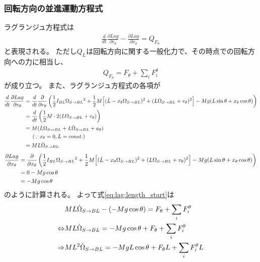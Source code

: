 \documentclass[a4paper,11pt]{jsarticle}
\begin{document}
\subsubsection*{回転方向の並進運動方程式}
ラグランジュ方程式は
\begin{align*}
  \frac{d}{dt}\frac{\partial Lag}{\partial v_\theta} - \frac{\partial Lag}{\partial x_\theta} = Q_{F_\theta}
\end{align*}
と表現される。
ただし$Q_L$は回転方向に関する一般化力で、その時点での回転方向への力に相当し、
\begin{align*}
  Q_{F_\theta} = F_\theta + \sum_i F_i^\theta
\end{align*}
が成り立つ。
また、ラグランジュ方程式の各項が
\begin{align*}
  \frac{d}{dt}\frac{\partial Lag}{\partial v_\theta}
  &= \frac{d}{dt}\frac{\partial }{\partial v_\theta}
  \left(
    \frac{1}{2}I_{BL}\Omega_{S\rightarrow BL}{}^2
    + \frac{1}{2}M
    \Bigl[ (\dot{L} - x_\theta \Omega_{S\rightarrow BL}{})^2 + (L\Omega_{S\rightarrow BL}{} + v_\theta)^2 \Bigr]
    - Mg ( L\sin\theta + x_\theta \cos\theta )
  \right)
  \\
  & = \frac{d}{dt}\left( \frac{1}{2}M \cdot 2(L\Omega_{S\rightarrow BL}{} + v_\theta )\right)
  \\
  &= M( \dot{L}\Omega_{S\rightarrow BL}{} + L\dot\Omega_{S\rightarrow BL}{} + a_\theta )
  \\
  & \ \ \ \ \left( \because x_\theta = 0, L = const. \right)
  \\
  &= M L \dot\Omega_{S\rightarrow BL}{}
\end{align*}
\begin{align*}
  \frac{\partial Lag}{\partial x_\theta}
  &= \frac{\partial }{\partial x_\theta}
  \left(
    \frac{1}{2}I_{BL}\Omega_{S\rightarrow BL}{}^2
    + \frac{1}{2}M
    \Bigl[ (\dot{L} - x_\theta \Omega_{S\rightarrow BL}{})^2 + (L\Omega_{S\rightarrow BL}{} + v_\theta)^2 \Bigr]
    - Mg ( L\sin\theta + x_\theta \cos\theta )
  \right)
  \\
  &= 0 - Mg\cos\theta
  \\
  &= - Mg\cos\theta
\end{align*}
のように計算される。
よって式\ref{eq:lag:length_start}は
\begin{align}
  & M L \dot\Omega_{S\rightarrow BL}{} - ( - Mg\cos\theta ) = F_\theta + \sum_i F_i^\theta
  \notag
  \\
  \Leftrightarrow
  & M L \dot\Omega_{S\rightarrow BL}{} = - Mg \cos\theta + F_\theta + \sum_i F_i^\theta
  \notag
  \\
  \Rightarrow
  & M L^2 \dot\Omega_{S\rightarrow BL}{} = - Mg L \cos\theta + F_\theta L + \sum_i F_i^\theta L
  \label{eq:lag:x_middle}
\end{align}
\end{document}
